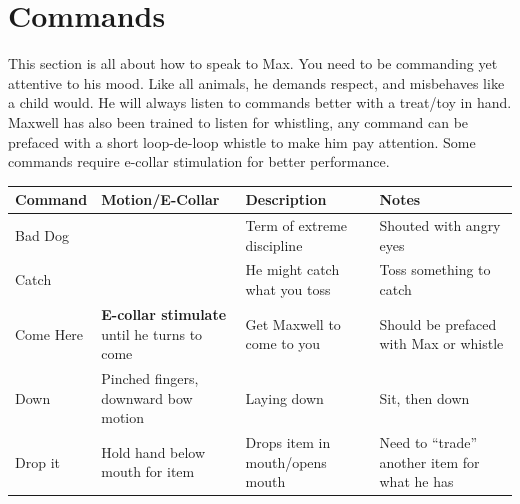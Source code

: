 \documentclass[pdftex,12pt]{article}
\begin{document}
\newpage
\section{Commands}

This section is all about how to speak to Max. You need to be commanding yet attentive to his mood.
Like all animals, he demands respect, and misbehaves like a child would.
He will always listen to commands better with a treat/toy in hand.
Maxwell has also been trained to listen for whistling, any command can be prefaced with a short loop-de-loop whistle to make him pay attention.
Some commands require e-collar stimulation for better performance.

\bigskip%

\begin{table}[H]\label{tab:commands}
\begin{adjustwidth}{-4.5cm}{-4.5cm}
\begin{center}
\bgroup%
\def\arraystretch{1.3} %
\begin{tabular}{lp{}p{}p{}}
\rowcolor{gray!50} Command    & Motion/E-Collar                                                  & Description                                           & Notes                                                                \\
\bottomrule
\rowcolor{white}   Bad Dog    &                                                                  & Term of extreme discipline                            & Shouted with angry eyes                                              \\
\rowcolor{gray!25} Catch      &                                                                  & He might catch what you toss                          & Toss something to catch                                              \\
\rowcolor{white}   Come Here  & \textbf{E-collar stimulate} until he turns to come               & Get Maxwell to come to you                            & Should be prefaced with Max or whistle                               \\
\rowcolor{gray!25} Down       & Pinched fingers, downward bow motion                             & Laying down                                           & Sit, then down                                                       \\
\rowcolor{white}   Drop it    & Hold hand below mouth for item                                   & Drops item in mouth/opens mouth                       & Need to ``trade'' another item for what he has                       \\

\end{tabular}
\end{center}
\end{adjustwidth}
\end{table}
\end{document}
